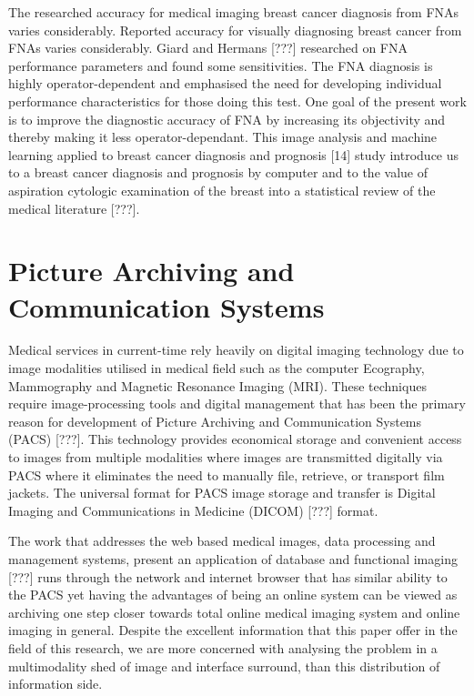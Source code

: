 \clearpage

The researched accuracy for medical imaging breast cancer diagnosis from FNAs varies considerably. Reported accuracy for visually diagnosing breast cancer from FNAs varies considerably. Giard and Hermans [???] researched on FNA performance parameters and found some sensitivities. The FNA diagnosis is highly operator-dependent and emphasised the need for developing individual performance characteristics for those doing this test. One goal of the present work is to improve the diagnostic accuracy of FNA by increasing its objectivity and thereby making it less operator-dependant. This image analysis and machine learning applied to breast cancer diagnosis and prognosis [14] study introduce us to a breast cancer diagnosis and prognosis by computer and to the value of aspiration cytologic examination of the breast into a statistical review of the medical literature [???].

\section{Picture Archiving and Communication Systems}

Medical services in current-time rely heavily on digital imaging technology due to image modalities utilised in medical field such as the computer Ecography, Mammography and Magnetic Resonance Imaging (MRI). These techniques require image-processing tools and digital management that has been the primary reason for development of Picture Archiving and Communication Systems (PACS) [???]. This technology provides economical storage and convenient access to images from multiple modalities where images are transmitted digitally via PACS where it eliminates the need to manually file, retrieve, or transport film jackets. The universal format for PACS image storage and transfer is Digital Imaging and Communications in Medicine (DICOM) [???] format.

The work that addresses the web based medical images, data processing and management systems, present an application of database and functional imaging [???] runs through the network and internet browser that has similar ability to the PACS yet having the advantages of being an online system can be viewed as archiving one step closer towards total online medical imaging system and online imaging in general. Despite the excellent information that this paper offer in the field of this research, we are more concerned with analysing the problem in a multimodality shed of image and interface surround, than this distribution of information side.

